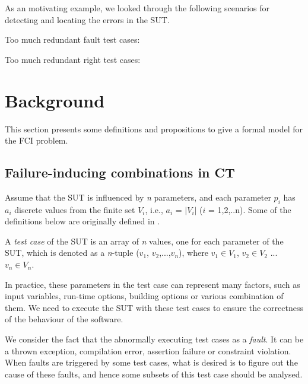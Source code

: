\documentclass{sig-alternate}
\begin{document}
As an motivating example, we looked through the following scenarios for detecting and locating the errors in the SUT.

Too much redundant fault test cases:


Too much redundant right test cases:

\section{Background}
This section presents some definitions and propositions to give a formal model for the FCI problem.

\subsection{Failure-inducing combinations in CT}

Assume that the SUT is influenced by \emph{n} parameters, and each parameter $p_{i}$ has $a_{i}$ discrete values from the finite set $V_{i}$, i.e., $a_{i}$ = $|V_{i}|$ ($i$ = 1,2,..n). Some of the definitions below are originally defined in .

\begin{definition}
A \emph{test case} of the SUT is an array of \emph{n} values, one for each parameter of the SUT, which is denoted as a \emph{n}-tuple ($v_{1}$, $v_{2}$,...,$v_{n}$), where $v_{1}\in V_{1}$, $v_{2} \in V_{2}$ ... $v_{n} \in V_{n}$.
\end{definition}

In practice, these parameters in the test case can represent many factors, such as input variables, run-time options, building options or various combination of them. We need to execute the SUT with these test cases to ensure the correctness of the behaviour of the software.

We consider the fact that the abnormally executing test cases as a \emph{fault}. It can be a thrown exception, compilation error, assertion failure or constraint violation. When faults are triggered by some test cases, what is desired is to figure out the cause of these faults, and hence some subsets of this test case should be analysed.

\end{document}
